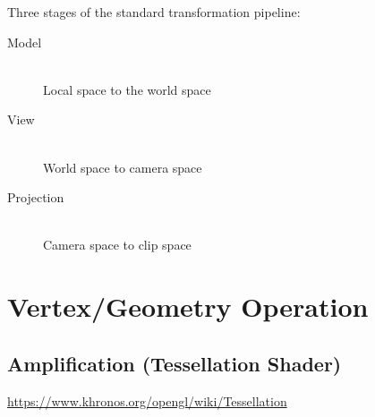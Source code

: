 \documentclass[a4paper]{article}
\begin{document}
Three stages of the standard transformation pipeline:

\begin{description}
  \item[Model] \hfill \\
    Local space to the world space

  \item[View] \hfill \\
    World space to camera space

  \item[Projection] \hfill \\
    Camera space to clip space

\end{description}

\section{Vertex/Geometry Operation}

\subsection{Amplification (Tessellation Shader)}

\url{https://www.khronos.org/opengl/wiki/Tessellation}
\end{document}
